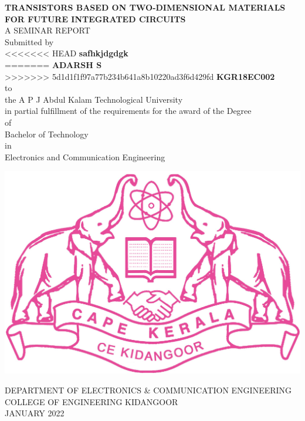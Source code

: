 \documentclass[12pt,a4paper]{report}
\begin{document}
\begin{center}
{\Large \textbf{TRANSISTORS BASED ON TWO-DIMENSIONAL MATERIALS
FOR FUTURE INTEGRATED CIRCUITS
}}\\
\vspace{2cm}
A SEMINAR REPORT\\
\vspace{0.5cm}
Submitted by \\
\vspace{1cm}
<<<<<<< HEAD
\textbf{safhkjdgdgk}\\
=======
\textbf{ADARSH S}\\
>>>>>>> 5d1d1f1f97a77b234b641a8b10220ad3f6d429fd
\vspace{0.2cm}
\textbf{KGR18EC002}\\
\vspace{0.2cm} to\\


 the A P J Abdul Kalam Technological University \\
in partial fulfillment of the requirements for the award 
of the Degree \\
of\\
Bachelor of Technology \\
in\\
Electronics and Communication Engineering
\end{center}


\begin{center}

\vspace{1.2cm}

\includegraphics[scale=0.3]{ceklogo.jpg}

DEPARTMENT OF ELECTRONICS \& COMMUNICATION ENGINEERING\\

COLLEGE OF ENGINEERING KIDANGOOR\\

JANUARY 2022\\
\end{center}
\end{document}

